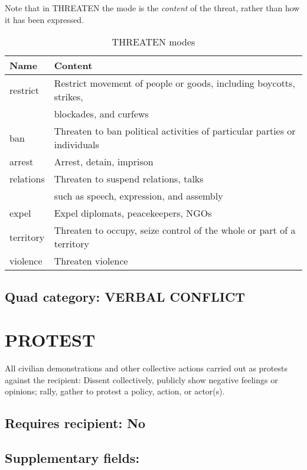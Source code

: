 \documentclass[11pt]{report}
\newcommand{\plcat}[1]{\textsf{#1}}
\newcommand{\ti}[1]{\textit{#1}}
\begin{document}
Note that in \plcat{THREATEN} the mode is the \ti{content} of the threat, rather than how it has been expressed.

\begin{table}[htp]
\caption{THREATEN modes}
\begin{center}
\begin{tabular}{|l|l|}
\hline
Name & Content \\
\hline
restrict & Restrict movement of people or goods, including boycotts, strikes,  \\
& blockades, and curfews \\
ban & Threaten to ban political activities of particular parties or individuals \\
arrest & Arrest, detain, imprison \\
relations & Threaten to suspend relations, talks \\
& such as speech, expression, and assembly\\
expel & Expel diplomats, peacekeepers, NGOs \\
territory & Threaten to occupy, seize control of the whole or part of a territory \\
violence & Threaten violence \\
\hline
\end{tabular}
\end{center}
\label{tab:threatmode}
\end{table}%

\subsection{Quad category: VERBAL CONFLICT}

\newpage

\section{PROTEST}

All civilian demonstrations and other collective actions carried out as protests against the recipient: Dissent collectively, publicly show negative feelings or opinions; rally, gather to protest a policy, action, or actor(s).

\subsection{Requires recipient: No}

\subsection{Supplementary fields:}
\end{document}
